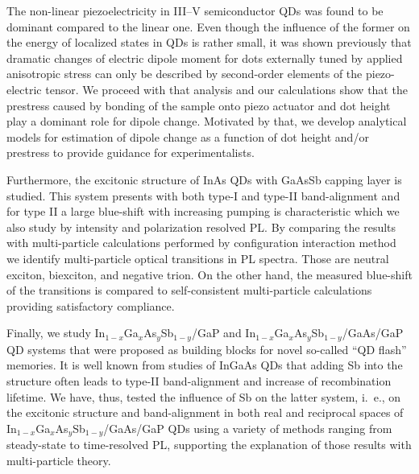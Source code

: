 \documentclass[
a4paper, %
11pt, %
onecolumn, %
openany, %
oldfontcommands,
]{memoir}
\begin{document}
The non-linear piezoelectricity in III--V semiconductor QDs was found to be dominant compared to the linear one. Even though the influence of the former on the energy of localized states in QDs is rather small, it was shown previously that dramatic changes of electric dipole moment for dots externally tuned by applied anisotropic stress can only be described by second-order elements of the piezo-electric tensor. 
%
%
We proceed with that analysis and our calculations show that the prestress caused by bonding of the sample onto piezo actuator and dot height play a dominant role for dipole change. Motivated by that, we develop analytical models for estimation of dipole change as a function of dot height and/or prestress to provide guidance for experimentalists.

Furthermore, the excitonic structure of InAs QDs with GaAsSb capping layer is studied. This system presents with both type-I and type-II band-alignment and for type II a large blue-shift with increasing pumping is characteristic which we also study by intensity and polarization resolved PL. By comparing the results with multi-particle calculations performed by configuration interaction method we identify multi-particle optical transitions in PL spectra. Those are neutral exciton, biexciton, and negative trion. On the other hand, the measured blue-shift of the transitions is compared to self-consistent multi-particle calculations providing satisfactory compliance.

%
Finally, we study In$_{1-x}$Ga$_x$As$_y$Sb$_{1-y}$/GaP and In$_{1-x}$Ga$_x$As$_y$Sb$_{1-y}$/GaAs/GaP QD systems that were proposed as building blocks for novel so-called \enquote{QD flash} memories.
It is well known from studies of InGaAs QDs that adding Sb into the structure often leads to type-II band-alignment and increase of recombination lifetime. We have, thus, tested the influence of Sb on the latter system, i.~e., on the excitonic structure and band-alignment in both real and reciprocal spaces of In$_{1-x}$Ga$_x$As$_y$Sb$_{1-y}$/GaAs/GaP QDs using a variety of methods ranging from steady-state to time-resolved PL, supporting the explanation of those results with multi-particle theory.
\newpage
%
\cleardoublepage

\newpage
\end{document}
